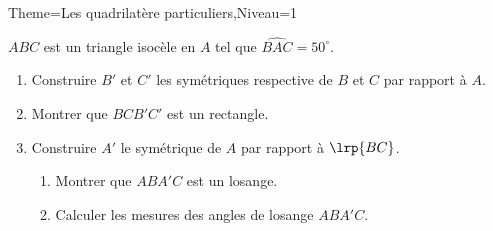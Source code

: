 \documentclass[a4paper,12pt]{article}
\begin{document}
\begin{Maquette}[Fiche]{Theme=Les quadrilatère particuliers,Niveau=1}
\begin{exercice}
$ABC$ est un triangle isocèle en $A$ tel que $\widehat{BAC}=50^{\circ}$.
\begin{enumerate}
\item Construire $B'$ et $C'$ les symétriques respective de $B$ et $C$ par rapport à $A$.
\item Montrer que $BCB'C'$ est un rectangle.
\item Construire $A'$ le symétrique de $A$ par rapport à $\lrp{BC}$.
\begin{enumerate}
\item Montrer que $ABA'C$ est un losange.
\item Calculer les mesures des angles de losange $ABA'C$.
\end{enumerate}
\end{enumerate}
\end{exercice}













\end{Maquette}
\end{document}
